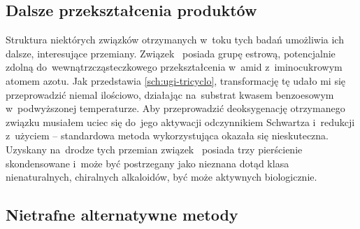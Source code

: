 \subsection{Dalsze przekształcenia produktów}
Struktura niektórych związków otrzymanych w~toku tych badań umożliwia ich dalsze,
  interesujące przemiany.
Związek~ posiada grupę estrową, potencjalnie zdolną do~wewnątrzcząsteczkowego
  przekształcenia w~amid z~iminocukrowym atomem azotu.
Jak przedstawia \cref{sch:ugi-tricyclo}, transformację tę udało mi się przeprowadzić niemal
  ilościowo, działając na~substrat kwasem benzoesowym w~podwyższonej temperaturze.
Aby przeprowadzić deoksygenację otrzymanego związku musiałem
  uciec się do~jego aktywacji odczynnikiem Schwartza i~redukcji z~użyciem  \---
  standardowa metoda wykorzystująca  okazała się nieskuteczna.
Uzyskany na~drodze tych przemian związek~ posiada trzy pierścienie
  skondensowane i~może być postrzegany jako nieznana dotąd klasa nienaturalnych, chiralnych
  alkaloidów, być może aktywnych biologicznie.

\begin{scheme*}
  
  \caption{%
    Synteza nowej klasy alkaloidu  z~iminocukru ,
      otrzymanego przy użyciu opracowanej przeze mnie metodologii.
  }
  \label{sch:ugi-tricyclo}
\end{scheme*}

\subsection{Nietrafne alternatywne metody}
